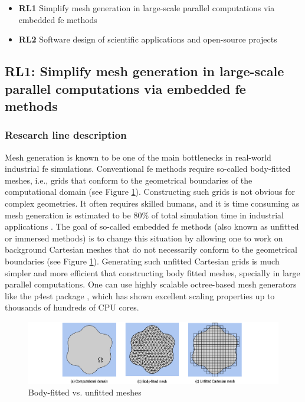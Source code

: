 \documentclass{article}
\begin{document}
\begin{itemize}
\item {\bf RL1}  Simplify mesh generation in large-scale parallel computations via embedded \ac{fe} methods
\item {\bf RL2}  Software design of scientific applications and open-source projects
\end{itemize}

\subsection{RL1: Simplify mesh generation in large-scale parallel computations via embedded \ac{fe} methods}

\subsubsection{Research line description}


Mesh generation is known to be one of the main bottlenecks in real-world industrial \ac{fe} simulations. Conventional \ac{fe} methods require so-called body-fitted meshes, i.e., grids that conform to the geometrical boundaries of the computational domain (see Figure \ref{fig:fitted-vs-unfitted}). Constructing such grids is not obvious for complex geometries. It often requires skilled humans, and it is time consuming as mesh generation is estimated to be 80\% of total simulation time in industrial applications \cite{Cottrell2009}. The goal of so-called embedded \ac{fe} methods \cite{Badia2018,burman_cutfem:_2015,Schillinger2015} (also known as unfitted or immersed methods) is to change this situation by allowing one to work on background Cartesian meshes that do not necessarily conform to the geometrical boundaries (see Figure \ref{fig:fitted-vs-unfitted}). Generating such unfitted Cartesian grids is much simpler and more efficient that constructing body fitted meshes, specially in large parallel computations.  One can use highly scalable octree-based mesh generators like the p4est package \cite{burstedde_p4est_2011}, which has shown excellent scaling properties up to thousands of hundreds of CPU cores. 

\begin{figure}[ht!]
\includegraphics[width=\textwidth]{assets/fig1.png}
\caption{Body-fitted vs. unfitted meshes}
\label{fig:fitted-vs-unfitted}
\end{figure}
\end{document}
